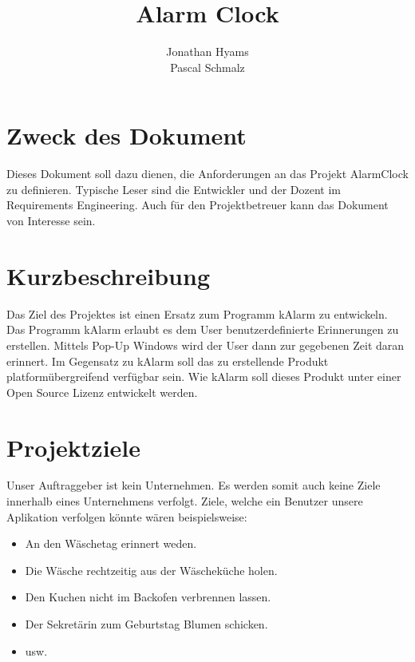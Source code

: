 \documentclass[11pt,titelpage]{scrartcl}
\title{Alarm Clock }
\author{Jonathan Hyams \\Pascal Schmalz}
\begin{document}
\thispagestyle{empty}
\maketitle
\tableofcontents

\pagestyle{fancy}


\begin{abstract}
\end{abstract}
\pagebreak

\section{Zweck des Dokument}
Dieses Dokument soll dazu dienen, die Anforderungen an das Projekt AlarmClock zu definieren. Typische Leser sind die
Entwickler und der Dozent im Requirements Engineering. Auch für den Projektbetreuer kann das Dokument von Interesse sein.

\section{Kurzbeschreibung}
Das Ziel des Projektes ist einen Ersatz zum Programm kAlarm zu entwickeln.
Das Programm kAlarm erlaubt es dem User benutzerdefinierte Erinnerungen zu erstellen. Mittels Pop-Up Windows wird der
User dann zur gegebenen Zeit daran erinnert. Im Gegensatz zu kAlarm soll das zu erstellende Produkt
platformübergreifend verfügbar sein. Wie kAlarm soll dieses Produkt unter einer Open Source Lizenz entwickelt werden.

\section{Projektziele}
Unser Auftraggeber ist kein Unternehmen. Es werden somit auch keine Ziele innerhalb eines Unternehmens verfolgt.
Ziele, welche ein Benutzer unsere Aplikation verfolgen könnte wären beispielsweise:
\begin{itemize}
 \item An den Wäschetag erinnert weden.
 \item Die Wäsche rechtzeitig aus der Wäscheküche holen.
 \item Den Kuchen nicht im Backofen verbrennen lassen.
 \item Der Sekretärin zum Geburtstag Blumen schicken.
 \item usw.

\end{itemize}
\end{document}
